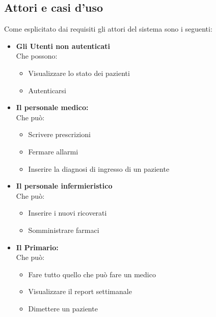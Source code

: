 \documentclass[a4paper]{report}
\begin{document}
        \subsection{Attori e casi d'uso}
            Come esplicitato dai requisiti gli attori del sistema sono i seguenti:
            \begin{itemize}
                \item \textbf{Gli Utenti non autenticati}\\Che possono:
                    \begin{itemize}
                        \item Visualizzare lo stato dei pazienti
                        \item Autenticarsi
                    \end{itemize} 
                \item \textbf{Il personale medico:}\\Che può:
                    \begin{itemize}
                        \item Scrivere prescrizioni
                        \item Fermare allarmi
                        \item Inserire la diagnosi di ingresso di un paziente
                    \end{itemize}
                \item \textbf{Il personale infermieristico}\\Che può:
                    \begin{itemize}
                        \item Inserire i nuovi ricoverati
                        \item Somministrare farmaci
                    \end{itemize}
                \item \textbf{Il Primario:}\\Che può:
                    \begin{itemize}
                        \item Fare tutto quello che può fare un medico
                        \item Visualizzare il report settimanale
                        \item Dimettere un paziente
                    \end{itemize}
            \end{itemize}
            
\end{document}

